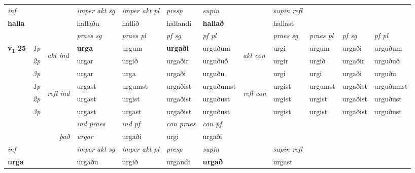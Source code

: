 \begin{longtable}[l]{X>{\footnotesize\itshape}llXXXXlXXXX}
\cmidrule{4-7}
   {\textit{inf}} & &  & \textit{imper akt sg} & \textit{imper akt pl}   & \textit{presp} & \textit{supin} && \textit{supin refl}  \\*
  {\textbf{halla}} & && hallaðu  & hallið   & hallandi &  \textbf{hallað} && hallast  \\*

\midrule

 & &   & \textit{praes sg}  & \textit{praes pl}    & \textit{ pf sg} & \textit{pf pl} & & \textit{praes sg}  & \textit{praes pl}    & \textit{pf sg} & \textit{pf pl }  \\ \cmidrule{4-7} \cmidrule{9-12}
 \multirow{2}{*}{{{\textbf{v{\textsubscript{1}}} \Large{\textbf{25}}}}}  & 1p & \multirow{3}{*}{\begin{turn}{90}\textit{akt ind}\end{turn}} & \textbf{urga} & urgum & \textbf{urgaði} & urguðum & \multirow{3}{*}{\begin{turn}{90}\textit{akt con}\end{turn}} &urgi & urgum & urgaði & urguðum\\*
 & 2p &  &  urgar  & urgið & urgaðir & urguðuð & & urgir & urgið & urgaðir & urguðuð \\*
 & 3p &  & urgar & urga & urgaði & urguðu & & urgi & urgi& urgaði & urguðu \\*
\cmidrule{4-7} \cmidrule{9-12}
 & 1p & \multirow{3}{*}{\begin{turn}{90}\textit{refl ind}\end{turn}}  & urgast & urgumst & urgaðist & urguðumst & \multirow{3}{*}{\begin{turn}{90}\textit{refl con}\end{turn}}  &urgist & urgumst & urgaðist & urguðumst \\*
 & 2p &  & urgast & urgist & urgaðist & urguðust & &urgist & urgist & urgaðist & urguðust \\*
 & 3p  & & urgast & urgast & urgaðist & urguðust & & urgist & urgist& urgaðist & urguðust \\*
\cmidrule{4-7} \cmidrule{9-12}

   && &  \textit{ind praes} & \textit{ind pf} & \textit{con praes} & \textit{con pf} \\*
\multicolumn{3}{r}{\textit{það}} & urgar & urgaði & urgi & urgaði \\*

\cmidrule{4-7}
   {\textit{inf}} & &  & \textit{imper akt sg} & \textit{imper akt pl}   & \textit{presp} & \textit{supin} && \textit{supin refl}  \\*
  {\textbf{urga}} & && urgaðu  & urgið   & urgandi &  \textbf{urgað} && urgast  \\*


\end{longtable}

